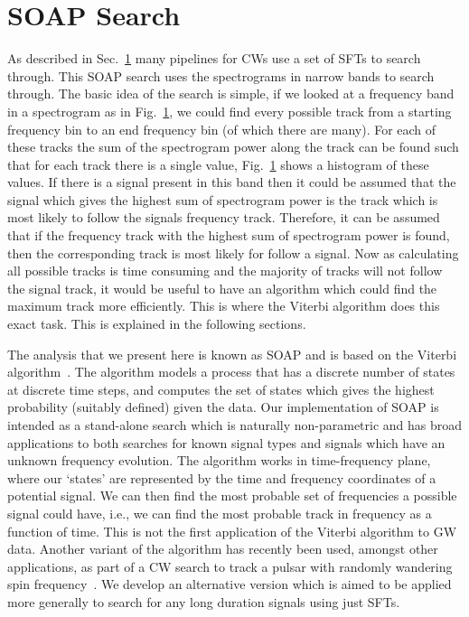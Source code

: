 \chapter{\label{soap}SOAP Search}

As described in Sec.~\ref{} many pipelines for \acp{CW} use a set of \acp{SFT} to search through.
This SOAP search uses the spectrograms in narrow bands to search through.
The basic idea of the search is simple, if we looked at a frequency band in a spectrogram as in Fig.~\ref{}, we could find every possible track from a starting frequency bin to an end frequency bin (of which there are many). For each of these tracks the sum of the spectrogram power along the track can be found such that for each track there is a single value, Fig.~\ref{} shows a histogram of these values. If there is a signal present in this band then it could be  assumed that the signal which gives the highest sum of spectrogram power is the track which is most likely to follow the signals frequency track.
Therefore, it can be assumed that if the frequency track with the highest sum of spectrogram power is found, then the corresponding track is most likely for follow a signal. 
Now as calculating all possible tracks is time consuming and the majority of tracks will not follow the signal track, it would be useful to have an algorithm which could find the maximum track more efficiently. This is where the Viterbi algorithm \cite{Viterbi1967} does this exact task. This is explained in the following sections.

%
%
The analysis that we present here is known as SOAP \cite{soap} and is based on the Viterbi algorithm~\cite{Viterbi1967}. The algorithm models a process that has a discrete number of states at discrete time steps, and computes the set of states which gives the highest probability (suitably defined) given the data. Our implementation of SOAP is intended as a stand-alone search which is naturally non-parametric and has broad applications to both searches for known signal types and signals which have an unknown frequency evolution. The algorithm works in time-frequency plane, where our `states' are represented by the time and frequency coordinates of a potential signal. We can then find the most probable set of frequencies a possible signal could have, i.e., we can find the most probable track in frequency as a function of time. This is not the first application of the Viterbi algorithm to \ac{GW} data. Another variant of the algorithm \cite{Suvorova2016} has recently been used, amongst other applications, as part of a \ac{CW} search to track a pulsar with randomly wandering spin frequency~\cite{PhysRevD.97.043013, PhysRevD.96.102006,PhysRevD.95.122003, Abbott:2018hgk, 2018arXiv181003577S}. We develop an alternative version which is aimed to be applied more generally to search for any long duration signals using just \acp{SFT}.

